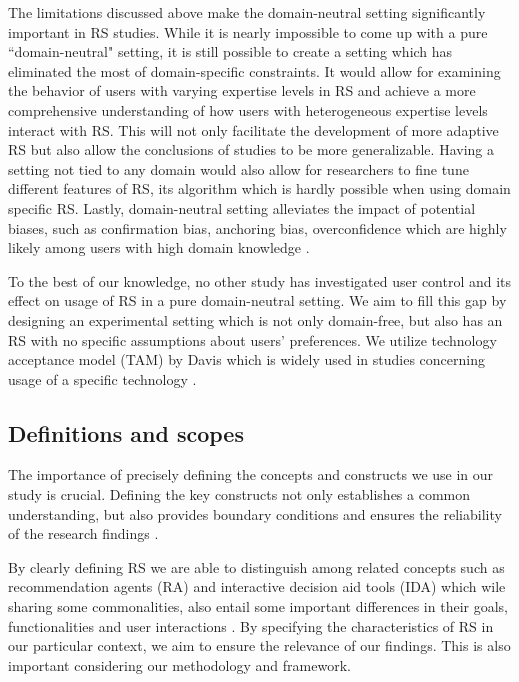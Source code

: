 \documentclass[a4paper,12pt]{article}
\begin{document}
The limitations discussed above make the domain-neutral setting significantly important in RS studies. While it is nearly impossible to come up with a pure ``domain-neutral" setting, it is still possible to create a setting which has eliminated the most of domain-specific constraints. It would allow for examining the behavior of users with varying expertise levels in RS and achieve a more comprehensive understanding of how users with heterogeneous expertise levels interact with RS. This will not only facilitate the development of more adaptive RS but also allow the conclusions of studies to be more generalizable. Having a setting not tied to any domain would also allow for researchers to fine tune different features of RS, its algorithm which is hardly possible when using domain specific RS. Lastly, domain-neutral setting alleviates the impact of potential biases, such as confirmation bias, anchoring bias, overconfidence which are highly likely among users with high domain knowledge \citep{hijikata2012relation}.

To the best of our knowledge, no other study has investigated user control and its effect on usage of RS in a pure domain-neutral setting. We aim to fill this gap by designing an experimental setting which is not only domain-free, but also has an RS with no specific assumptions about users' preferences. We utilize technology acceptance model (TAM) by Davis which is widely used in studies concerning usage of a specific technology \citep{davis1985technology}.

\subsection{Definitions and scopes}

The importance of precisely defining the concepts and constructs we use in our study is crucial. Defining the key constructs not only establishes a common understanding, but also provides boundary conditions and ensures the reliability of the research findings \citep{creswell2013research}.

By clearly defining RS we are able to distinguish among related concepts such as recommendation agents (RA) and interactive decision aid tools (IDA) which wile sharing some commonalities, also entail some important differences in their goals, functionalities and user interactions \citep{xiao2007commerce}. By specifying the characteristics of RS in our particular context, we aim to ensure the relevance of our findings. This is also important considering our methodology and framework.
\end{document}

